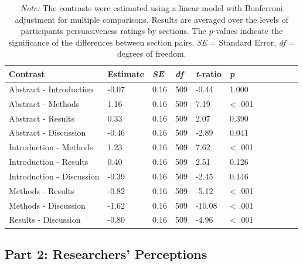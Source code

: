 \documentclass[authordate, meta]{jote-new-article}
\begin{document}
	\begin{table}
		\caption{Estimated Differences Between Sections with Bonferroni Adjustment}
		\begin{tabular}{@{} l l l l l l l l l l l @{}}
			 Contrast & Estimate & \emph{SE} &  \emph{df } & \emph{t}-ratio & \emph{p}
			\\

			\hline Abstract - Introduction & -0.07 & 0.16 & 509 & -0.44 & 1.000 \\

			 Abstract - Methods & 1.16 & 0.16 & 509 & 7.19 & < .001 \\

			 Abstract - Results & 0.33 & 0.16 & 509 & 2.07 & 0.390 \\

			 Abstract - Discussion & -0.46 & 0.16 & 509 & -2.89 & 0.041 \\

			 Introduction - Methods & 1.23 & 0.16 & 509 & 7.62 & < .001 \\

			 Introduction - Results & 0.40 & 0.16 & 509 & 2.51 & 0.126 \\

			 Introduction - Discussion & -0.39 & 0.16 & 509 & -2.45 & 0.146 \\

			 Methods - Results & -0.82 & 0.16 & 509 & -5.12 & < .001 \\

			 Methods - Discussion & -1.62 & 0.16 & 509 & -10.08 & < .001 \\

			 Results - Discussion & -0.80 & 0.16 & 509 & -4.96 & < .001 \\


		\end{tabular}
		\caption*{\emph{Note: }The contrasts were estimated using a linear model with Bonferroni adjustment for multiple comparisons. Results are averaged over the levels of participants persuasiveness ratings by sections. The \emph{p}-values indicate the significance of the differences between section pairs. \emph{SE} = Standard Error, \emph{df} = degrees of freedom.}
	\end{table}

	



	\subsection{Part 2: Researchers' Perceptions}
\end{document}
